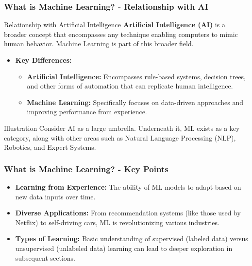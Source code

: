 \documentclass[aspectratio=169]{beamer}
\begin{document}
\begin{frame}[fragile]
    \frametitle{What is Machine Learning? - Relationship with AI}
    \begin{block}{Relationship with Artificial Intelligence}
        \textbf{Artificial Intelligence (AI)} is a broader concept that encompasses any technique enabling computers to mimic human behavior. Machine Learning is part of this broader field.
    \end{block}

    \begin{itemize}
        \item \textbf{Key Differences:}
        \begin{itemize}
            \item \textbf{Artificial Intelligence:} Encompasses rule-based systems, decision trees, and other forms of automation that can replicate human intelligence.
            \item \textbf{Machine Learning:} Specifically focuses on data-driven approaches and improving performance from experience.
        \end{itemize}
    \end{itemize}

    \begin{block}{Illustration}
        Consider AI as a large umbrella. Underneath it, ML exists as a key category, along with other areas such as Natural Language Processing (NLP), Robotics, and Expert Systems.
    \end{block}
\end{frame}

\begin{frame}[fragile]
    \frametitle{What is Machine Learning? - Key Points}
    \begin{itemize}
        \item \textbf{Learning from Experience:} The ability of ML models to adapt based on new data inputs over time.
        
        \item \textbf{Diverse Applications:} From recommendation systems (like those used by Netflix) to self-driving cars, ML is revolutionizing various industries.
        
        \item \textbf{Types of Learning:} Basic understanding of supervised (labeled data) versus unsupervised (unlabeled data) learning can lead to deeper exploration in subsequent sections.
    \end{itemize}
\end{frame}
\end{document}
